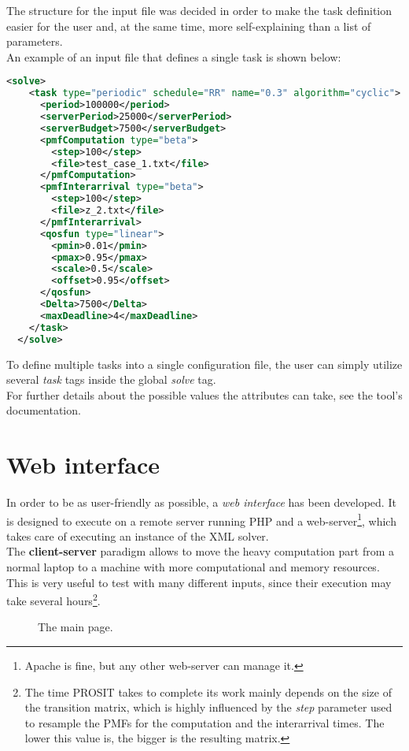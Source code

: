 The structure for the input file was decided in order to make the task definition easier for the user and, at the same time, more self-explaining than a list of parameters.\\
An example of an input file that defines a single task is shown below:
\begin{lstlisting}[frame=bt, language=XML, numbers=none]
  <solve>
    <task type="periodic" schedule="RR" name="0.3" algorithm="cyclic">
      <period>100000</period>
      <serverPeriod>25000</serverPeriod>
      <serverBudget>7500</serverBudget>
      <pmfComputation type="beta">
        <step>100</step>
        <file>test_case_1.txt</file>
      </pmfComputation>
      <pmfInterarrival type="beta">
        <step>100</step>
        <file>z_2.txt</file>
      </pmfInterarrival>
      <qosfun type="linear">
        <pmin>0.01</pmin>
        <pmax>0.95</pmax>
        <scale>0.5</scale>
        <offset>0.95</offset>
      </qosfun>
      <Delta>7500</Delta>
      <maxDeadline>4</maxDeadline>
    </task>
  </solve>
\end{lstlisting}

To define multiple tasks into a single configuration file, the user can simply utilize several \emph{task} tags inside the global \emph{solve} tag.\\ 
For further details about the possible values the attributes can take, see the tool's documentation.  

\section{Web interface}
In order to be as user-friendly as possible, a \emph{web interface} has been developed. It is designed to execute on a remote server running PHP and a web-server\footnote{Apache is fine, but any other web-server can manage it.}, which takes care of executing an instance of the XML solver.\\
The \textbf{client-server} paradigm allows to move the heavy computation part from a normal laptop to a machine with more computational and memory resources. This is very useful to test with many different inputs, since their execution may take several hours\footnote{The time PROSIT takes to complete its work mainly depends on the size of the transition matrix, which is highly influenced by the \emph{step} parameter used to resample the PMFs for the computation and the interarrival times. The lower this value is, the bigger is the resulting matrix.}.
\begin{figure}[H]
  \caption{The main page.}
  \label{index}
\end{figure}

